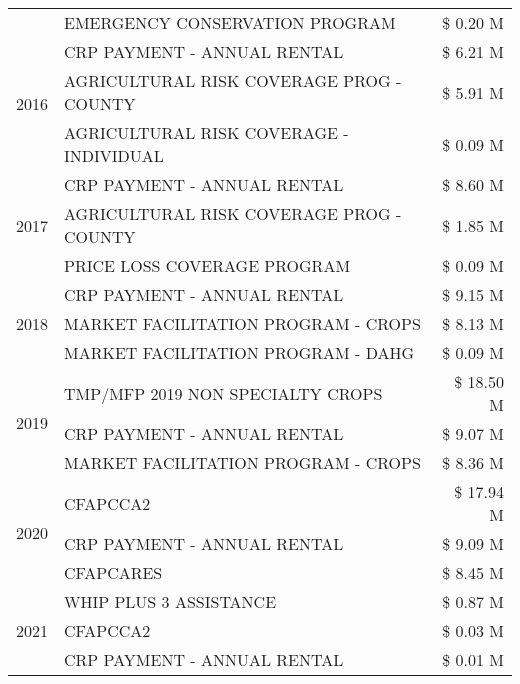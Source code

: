 \begin{tabular}{llr}
 & EMERGENCY CONSERVATION PROGRAM & \$ 0.20 M \\
\cline{1-3}
\multirow[t]{3}{*}{2016} & CRP PAYMENT - ANNUAL RENTAL & \$ 6.21 M \\
 & AGRICULTURAL RISK COVERAGE PROG - COUNTY & \$ 5.91 M \\
 & AGRICULTURAL RISK COVERAGE - INDIVIDUAL & \$ 0.09 M \\
\cline{1-3}
\multirow[t]{3}{*}{2017} & CRP PAYMENT - ANNUAL RENTAL & \$ 8.60 M \\
 & AGRICULTURAL RISK COVERAGE PROG - COUNTY & \$ 1.85 M \\
 & PRICE LOSS COVERAGE PROGRAM & \$ 0.09 M \\
\cline{1-3}
\multirow[t]{3}{*}{2018} & CRP PAYMENT - ANNUAL RENTAL & \$ 9.15 M \\
 & MARKET FACILITATION PROGRAM - CROPS & \$ 8.13 M \\
 & MARKET FACILITATION PROGRAM - DAHG & \$ 0.09 M \\
\cline{1-3}
\multirow[t]{3}{*}{2019} & TMP/MFP 2019 NON SPECIALTY CROPS & \$ 18.50 M \\
 & CRP PAYMENT - ANNUAL RENTAL & \$ 9.07 M \\
 & MARKET FACILITATION PROGRAM - CROPS & \$ 8.36 M \\
\cline{1-3}
\multirow[t]{3}{*}{2020} & CFAPCCA2 & \$ 17.94 M \\
 & CRP PAYMENT - ANNUAL RENTAL & \$ 9.09 M \\
 & CFAPCARES & \$ 8.45 M \\
\cline{1-3}
\multirow[t]{3}{*}{2021} & WHIP PLUS 3 ASSISTANCE & \$ 0.87 M \\
 & CFAPCCA2 & \$ 0.03 M \\
 & CRP PAYMENT - ANNUAL RENTAL & \$ 0.01 M \\
\cline{1-3}
\bottomrule
\end{tabular}
